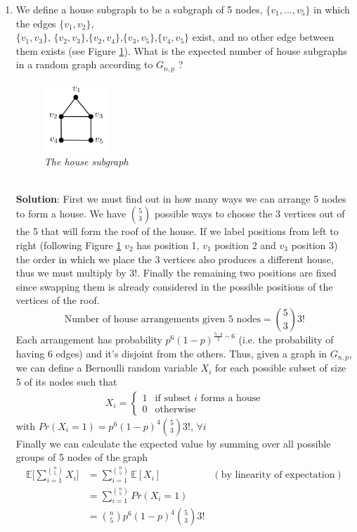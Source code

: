 \documentclass[a4paper]{article}
\begin{document}
\begin{enumerate}
    \item We  define a house subgraph to be a subgraph of 5 nodes, $\{v_1, ... ,v_5\}$ in which the
    edges $\{v_1,v_2\}$, \\ $\{v_1,v_3\}$, $\{v_2,v_3\}$,$\{v_2,v_4\}$,$\{v_3,v_5\}$,$\{v_4,v_5\}$
    exist, and no other edge between them exists (see Figure \ref{house}). What is the expected number of
    house subgraphs in a random graph according to $G_{n,p}$ ?
    \begin{figure}[!htbp]
    \begin{center}
    \includegraphics[width=70pt]{house.png}
    \end{center}
    \caption{\textit{The house subgraph}}\label{house}
    \end{figure}
    \\
    \textbf{Solution}: First we must find out in how many ways we can arrange 5 nodes to form a house. We have $\binom{5}{3}$ possible ways to choose the 3 vertices out of the 5 that will form the roof of the house. If we label positions from left to right (following Figure \ref{house} $v_2$ has position 1, $v_1$ position 2 and $v_3$ position 3) the order in which we place the 3 vertices also produces a different house, thus we must multiply by $3!$. Finally the remaining two positions are fixed since swapping them is already considered in the possible positions of the vertices of the roof.
    \[ \text{Number of house arrangements given 5 nodes} = \binom{5}{3}3! \]
    Each arrangement has probability $p^6(1-p)^{\frac{5\cdot4}{2} - 6}$ (i.e. the probability of having 6 edges) and it's disjoint from the others. Thus, given a graph in $G_{n,p}$, we can define a Bernoulli random variable $X_i$ for each possible subset of size 5 of its nodes such that
    \begin{align*}
    X_i =
    \begin{cases}
        1 & \text{if subset $i$ forms a house} \\
        0 & \text{otherwise}
    \end{cases}
    \end{align*}
    with $Pr(X_i = 1) = p^6(1-p)^{4}\binom{5}{3}3!$, $\forall i$ \\
    Finally we can calculate the expected value by summing over all possible groups of 5 nodes of the graph
    \begin{align*}
        \mathbb{E}\Bigg[ \sum_{i = 1}^{\binom{n}{5}} X_i \Bigg] &= \sum_{i = 1}^{\binom{n}{5}} \mathbb{E}[X_i] & (\text{by linearity of expectation}) \\
        &= \sum_{i = 1}^{\binom{n}{5}} Pr(X_i = 1) \\
        &= \binom{n}{5} p^6(1-p)^{4}\binom{5}{3}3!
    \end{align*}
\end{enumerate}
\end{document}
